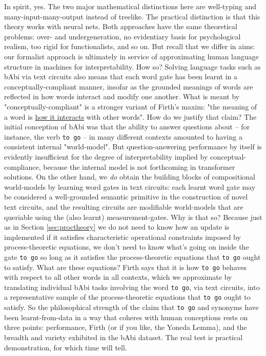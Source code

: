  In spirit, yes. The two major mathematical distinctions here are well-typing and many-input-many-output instead of treelike. The practical distinction is that this theory works with neural nets. Both approaches have the same theoretical problems: over- and undergeneration, no evidentiary basis for psychological realism, too rigid for functionalists, and so on. But recall that we differ in aims: our formalist approach is ultimately in service of approximating human language structure in machines for interpretability. How so? Solving language tasks such as bAbi via text circuits also means that each word gate has been learnt in a conceptually-compliant manner, insofar as the grounded meanings of words are reflected in how words interact and modify one another. What is meant by "conceptually-compliant" is a stronger variant of Firth's maxim: "the meaning of a word is \underline{how it interacts} with other words". How do we justify that claim? The initial conception of bAbi was that the ability to answer questions about -- for instance, the verb \texttt{to go} -- in many different contexts amounted to having a consistent internal "world-model". But question-answering performance by itself is evidently insufficient for the degree of interpretability implied by conceptual-compliance, because the internal model is not forthcoming in transformer solutions. On the other hand, we \emph{do} obtain the building blocks of compositional world-models by learning word gates in text circuits: each learnt word gate may be considered a well-grounded semantic primitive in the construction of novel text circuits, and the resulting circuits are modifiable world-models that are queriable using the (also learnt) measurement-gates. Why is that so? Because just as in Section \ref{sec:proctheory} we do not need to know how an update is implemented if it satisfies characteristic operational constraints imposed by process-theoretic equations, we don't need to know what's going on inside the gate \texttt{to go} so long as it satisfies the process-theoretic equations that \texttt{to go} ought to satisfy. What are these equations? Firth says that it is how \texttt{to go} behaves with respect to all other words in all contexts, which we approximate by translating individual bAbi tasks involving the word \texttt{to go}, via text circuits, into a representative sample of the process-theoretic equations that \texttt{to go} ought to satisfy. So the philosophical strength of the claim that \texttt{to go} and synonyms have been learnt-from-data in a way that coheres with human conceptions rests on three points: performance, Firth (or if you like, the Yoneda Lemma), and the breadth and variety exhibited in the bAbi dataset. The real test is practical demonstration, for which time will tell.

